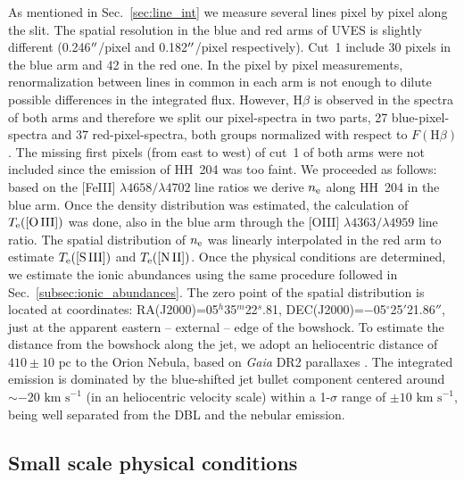 \documentclass[twocolumn,linenumbers]{aastex63}
\begin{document}
As mentioned in Sec.~\ref{sec:line_int} we measure several lines pixel by pixel along the slit. The spatial re\-so\-lu\-tion in the blue and red arms of UVES is slightly different (0.246$\mbox{$^{\prime\prime}$}$/pixel and 0.182$\mbox{$^{\prime\prime}$}$/pixel respectively). Cut~1 include 30 pixels in the blue arm and 42 in the red one. In the pixel by pixel measurements, renormalization between lines in common in each arm is not enough to dilute possible differences in the integrated flux. However, $\text{H}\beta$ is observed in the spectra of both arms and therefore we split our pixel-spectra in two parts, 27 blue-pixel-spectra and 37 red-pixel-spectra, both groups normalized with respect to $F(\text{H}\beta)$. The missing first pixels (from east to west) of cut~1 of both arms were not included since the emission of HH~204 was too faint. We proceeded as follows: based on the [Fe\thinspace III] $\lambda4658/\lambda 4702$ line ratios we derive $n_{\rm e}$ along HH~204 in the blue arm. Once the density distribution was estimated,  the calculation of $T_{\rm e}(\text{[O\thinspace III]})$ was done, also in the blue arm through the [O\thinspace III] $\lambda4363/\lambda 4959$ line ratio. The spatial distribution of $n_{\rm e}$ was linearly interpolated in the red arm to estimate $T_{\rm e}(\text{[S\thinspace III]})$ and $T_{\rm e}(\text{[N\thinspace II]})$. Once the physical conditions are determined, we estimate the ionic abundances using the same procedure followed in Sec.~\ref{subsec:ionic_abundances}. The zero point of the spatial distribution is located at coordinates: RA(J2000)=05$^h$35$^m$22$^s$.81, DEC(J2000)=$-$05$^{\circ}$25$'$21.86$''$, just at the apparent eastern -- external -- edge of the bowshock. To estimate the distance from the bowshock along the jet, we adopt an heliocentric distance of $410 \pm 10 \text{ pc}$ \citep{Binder2018} to the Orion Nebula, based on \textit{Gaia} DR2 parallaxes \citep{gaiadr2}. The integrated emission is dominated by the blue-shifted jet bullet component centered around $\sim -20 \text{ km s}^{-1}$ (in an heliocentric velocity scale) within a 1-$\sigma$ range of $\pm 10 \text{ km s}^{-1}$, being well separated from the DBL and the nebular emission.



\subsection{Small scale physical conditions}
\label{subsec:small_scale_pc}
\end{document}
